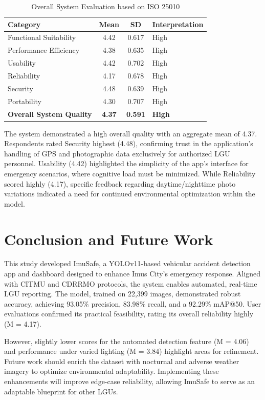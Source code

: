\documentclass[conference]{IEEEtran}
\begin{document}
\begin{table}[htbp]
\caption{Overall System Evaluation based on ISO 25010}
\begin{center}
\begin{tabular}{|l|c|c|l|}
\hline
\textbf{Category} & \textbf{Mean} & \textbf{SD} & \textbf{Interpretation} \\
\hline
Functional Suitability & 4.42 & 0.617 & High \\
\hline
Performance Efficiency & 4.38 & 0.635 & High \\
\hline
Usability & 4.42 & 0.702 & High \\
\hline
Reliability & 4.17 & 0.678 & High \\
\hline
Security & 4.48 & 0.639 & High \\
\hline
Portability & 4.30 & 0.707 & High \\
\hline
\textbf{Overall System Quality} & \textbf{4.37} & \textbf{0.591} & \textbf{High} \\
\hline
\end{tabular}
\label{tab:evaluation}
\end{center}
\end{table}

The system demonstrated a high overall quality with an aggregate mean of 4.37. Respondents rated Security highest (4.48), confirming trust in the application's handling of GPS and photographic data exclusively for authorized LGU personnel. Usability (4.42) highlighted the simplicity of the app's interface for emergency scenarios, where cognitive load must be minimized. While Reliability scored highly (4.17), specific feedback regarding daytime/nighttime photo variations indicated a need for continued environmental optimization within the model.

\section{Conclusion and Future Work}
This study developed ImuSafe, a YOLOv11-based vehicular accident detection app and dashboard designed to enhance Imus City's emergency response. Aligned with CITMU and CDRRMO protocols, the system enables automated, real-time LGU reporting. The model, trained on 22,399 images, demonstrated robust accuracy, achieving 93.05$\%$ precision, 83.98$\%$ recall, and a 92.29$\%$ mAP@50. User evaluations confirmed its practical feasibility, rating its overall reliability highly (M = 4.17).

However, slightly lower scores for the automated detection feature (M = 4.06) and performance under varied lighting (M = 3.84) highlight areas for refinement. Future work should enrich the dataset with nocturnal and adverse weather imagery to optimize environmental adaptability. Implementing these enhancements will improve edge-case reliability, allowing ImuSafe to serve as an adaptable blueprint for other LGUs.
\end{document}
